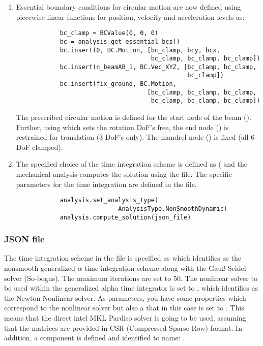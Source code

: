 \begin{enumerate}
    \item Essential boundary conditions for circular motion are now defined using piecewise linear functions  for position, velocity and acceleration levels as:
        \pythonstyle
        \begin{tcolorbox}\begin{lstlisting}
            bc_clamp = BCValue(0, 0, 0)
            bc = analysis.get_essential_bcs()
            bc.insert(0, BC.Motion, [bc_clamp, bcy, bcx, 
                                     bc_clamp, bc_clamp, bc_clamp])
            bc.insert(n_beamAB_1, BC.Vec_XYZ, [bc_clamp, bc_clamp, 
                                               bc_clamp])
            bc.insert(fix_ground, BC.Motion,
                                    [bc_clamp, bc_clamp, bc_clamp, 
                                     bc_clamp, bc_clamp, bc_clamp])
        \end{lstlisting}\end{tcolorbox}
    The prescribed circular motion is defined for the start node of the beam (). Further, using  which sets the rotation DoF's free, the end node () is restrained for translation (3 DoF's only). The mandrel node () is fixed (all 6 DoF clamped).        
    \item The specified choice of the time integration scheme is defined as ( and the mechanical analysis computes the solution using the  file. The specific parameters for the time integration are defined in the  file.
        \pythonstyle
        \begin{tcolorbox}\begin{lstlisting}
            analysis.set_analysis_type(
                            AnalysisType.NonSmoothDynamic)
            analysis.compute_solution(json_file)
        \end{lstlisting}\end{tcolorbox}    
\end{enumerate}

\subsubsection{JSON file}
The time integration scheme in the  file is specified as  which identifies as the nonsmooth generalized-$\alpha$ time integration scheme along with the Gau{\ss}-Seidel solver (So-bogus). The maximum iterations are set to 50. The nonlinear solver to be used within the generalized alpha time integrator is set to , which identifies as the Newton Nonlinear solver. As parameters, you have some properties which correspond to the nonlinear solver but also a  that in this case is set to . This means that the direct intel MKL Pardiso solver is going to be used, assuming that the matrices are provided in CSR (Compressed Sparse Row) format. In addition, a component  is defined and identified to name: .

